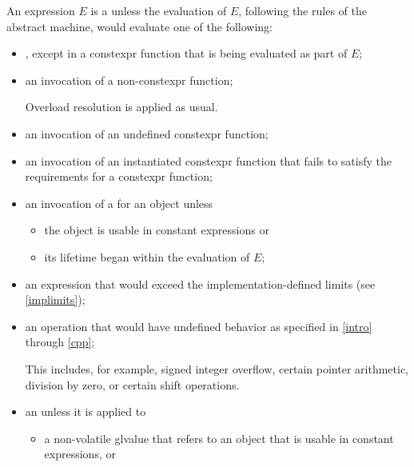 \pnum
An expression $E$ is a 
unless the evaluation of $E$, following the rules of the abstract
machine, would evaluate one of the following:
\begin{itemize}
\item
{}, except in a constexpr
function that is being evaluated as part
of $E$;

\item
an invocation of a non-constexpr function;
\begin{footnote}
Overload resolution
is applied as usual.
\end{footnote}

\item
an invocation of an undefined constexpr function;

\item
an invocation of an instantiated constexpr function
that fails to satisfy the requirements
for a constexpr function;

\item
an invocation of a 
for an object unless
  \begin{itemize}
  \item the object is usable in constant expressions or
  \item its lifetime began within the evaluation of $E$;
  \end{itemize}

\item
an expression that would exceed the implementation-defined
limits (see \ref{implimits});

\item
an operation that would have undefined behavior
as specified in \ref{intro} through \ref{cpp};
\begin{footnote}
This includes,
for example, signed integer overflow, certain
pointer arithmetic, division by
zero, or certain shift operations.
\end{footnote}

\item
an  unless
it is applied to
\begin{itemize}
  \item
  a non-volatile glvalue that refers to an object that is
  usable in constant expressions, or


\end{itemize}
\end{itemize}
